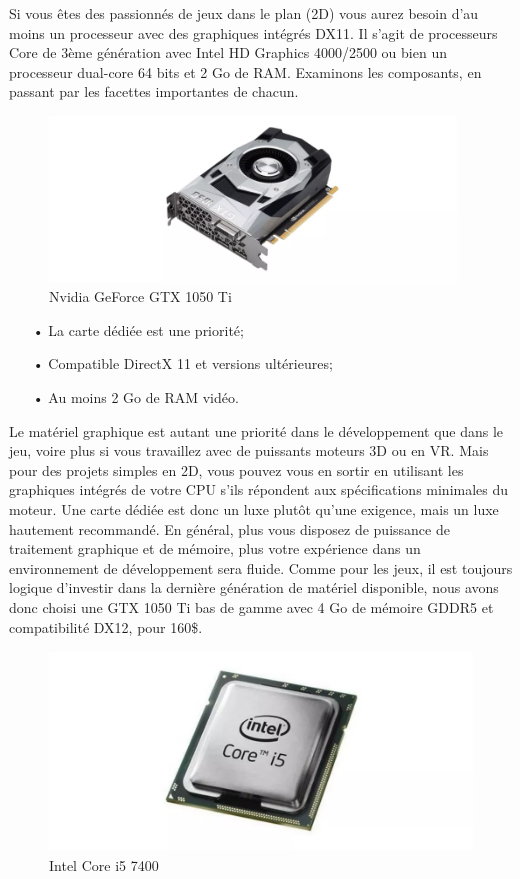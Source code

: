 \documentclass[ebook, 8pt, oneside, openany]{memoir}
\begin{document}
	Si vous êtes des passionnés de jeux dans le plan (2D) vous aurez besoin d'au moins un processeur avec 
	des graphiques intégrés DX11. Il s'agit de processeurs Core de 3ème génération avec Intel HD Graphics
	4000/2500 ou bien un processeur dual-core 64 bits et 2 Go de RAM. Examinons les composants, en passant 
	par les facettes importantes de chacun.
	\begin{figure}[h]
		\begin{center}\includegraphics[height = 125pt]{2d_graphic_card.png}\end{center}
		\caption{Nvidia GeForce GTX 1050 Ti}
		\label{Nvidia GeForce GTX 1050 Ti}
	\end{figure}
	\newpage \begin{itemize}
		\item[• La carte dédiée est une priorité;]
		\item[• Compatible DirectX 11 et versions ultérieures;]
		\item[• Au moins 2 Go de RAM vidéo.]
	\end{itemize}
	Le matériel graphique est autant une priorité dans le développement que dans le jeu, voire plus si vous
	travaillez avec de puissants moteurs 3D ou en VR. Mais pour des projets simples en 2D, vous pouvez vous
	en sortir en utilisant les graphiques intégrés de votre CPU s'ils répondent aux spécifications minimales
	du moteur. Une carte dédiée est donc un luxe plutôt qu'une exigence, mais un luxe hautement recommandé. 
	En général, plus vous disposez de puissance de traitement graphique et de mémoire, plus votre expérience
	dans un environnement de développement sera fluide. Comme pour les jeux, il est toujours logique
	d'investir dans la dernière génération de matériel disponible, nous avons donc choisi une GTX 1050 Ti
	bas de gamme avec 4 Go de mémoire GDDR5 et compatibilité DX12, pour 160\$.
	\begin{figure}[h]
		\begin{center}\includegraphics[height = 150pt]{2d_cpu.png}\end{center}
		\caption{Intel Core i5 7400}
		\label{Intel Core i5 7400}
	\end{figure}
\end{document}
